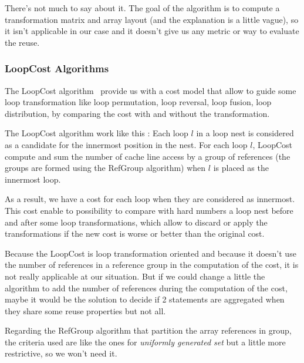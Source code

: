 \documentclass[paper=a4, fontsize=11pt]{scrartcl}
\numberwithin{equation}{section}        %
\numberwithin{figure}{section}          %
\numberwithin{table}{section}               %
\begin{document}
            There's not much to say about it. The goal of the algorithm is to
            compute a transformation matrix and array layout (and the explanation is a little
            vague), so it isn't applicable in our case and it doesn't give us any metric or way to evaluate the reuse.
        
        \subsubsection{LoopCost Algorithms}
            The LoopCost algorithm~\cite{McKinley:1996:IDL:233561.233564} provide
            us with a cost model that allow to guide some loop transformation like
            loop permutation, loop reversal, loop fusion, loop distribution,
            by comparing the cost with and without the transformation.
            
            The LoopCost algorithm work like this : 
            Each loop $l$ in a loop nest is considered as a candidate for the innermost
            position in the nest. For each loop $l$, LoopCost compute and sum the number
            of cache line access by a group of references (the groups are formed
            using the RefGroup algorithm) when $l$ is placed as the innermost loop.

            As a result, we have a cost for each loop when they are considered as innermost.
            This cost enable to possibility to compare with hard numbers
            a loop nest before and after some loop transformations, which allow to discard
            or apply the transformations if the new cost is worse or better than the
            original cost.
            \bigskip

            Because the LoopCost is loop transformation oriented and because it doesn't
            use the number of references in a reference group in the computation
            of the cost, it is not really applicable at our situation.
            But if we could change a little the algorithm to add the number of
            references during the computation of the cost, maybe it would be the
            solution to decide if 2 statements are aggregated when they share
            some reuse properties but not all.

            Regarding the RefGroup algorithm that partition the array references
            in group, the criteria used are like the ones for \textit{uniformly generated set}
            but a little more restrictive, so we won't need it.
            
\end{document}
